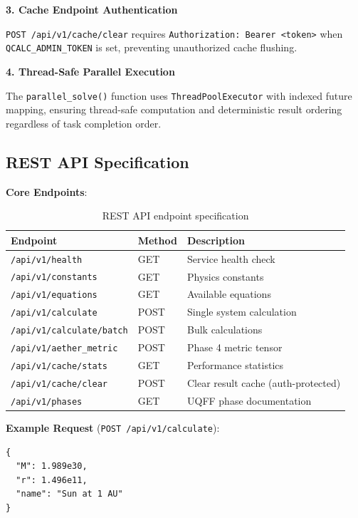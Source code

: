 \documentclass[12pt,a4paper]{article}
\begin{document}
\textbf{3. Cache Endpoint Authentication}

\texttt{POST /api/v1/cache/clear} requires \texttt{Authorization: Bearer <token>} when \texttt{QCALC\_ADMIN\_TOKEN} is set, preventing unauthorized cache flushing.

\textbf{4. Thread-Safe Parallel Execution}

The \texttt{parallel\_solve()} function uses \texttt{ThreadPoolExecutor} with indexed future mapping, ensuring thread-safe computation and deterministic result ordering regardless of task completion order.

\subsection{REST API Specification}

\textbf{Core Endpoints}:

\begin{table}[H]
\centering
\begin{tabular}{@{}llp{5cm}@{}}
\toprule
\textbf{Endpoint} & \textbf{Method} & \textbf{Description} \\
\midrule
\texttt{/api/v1/health} & GET & Service health check \\
\texttt{/api/v1/constants} & GET & Physics constants \\
\texttt{/api/v1/equations} & GET & Available equations \\
\texttt{/api/v1/calculate} & POST & Single system calculation \\
\texttt{/api/v1/calculate/batch} & POST & Bulk calculations \\
\texttt{/api/v1/aether\_metric} & POST & Phase 4 metric tensor \\
\texttt{/api/v1/cache/stats} & GET & Performance statistics \\
\texttt{/api/v1/cache/clear} & POST & Clear result cache (auth-protected) \\
\texttt{/api/v1/phases} & GET & UQFF phase documentation \\
\bottomrule
\end{tabular}
\caption{REST API endpoint specification}
\label{tab:api_endpoints}
\end{table}

\textbf{Example Request} (\texttt{POST /api/v1/calculate}):
\begin{verbatim}
{
  "M": 1.989e30,
  "r": 1.496e11,
  "name": "Sun at 1 AU"
}
\end{verbatim}
\end{document}
